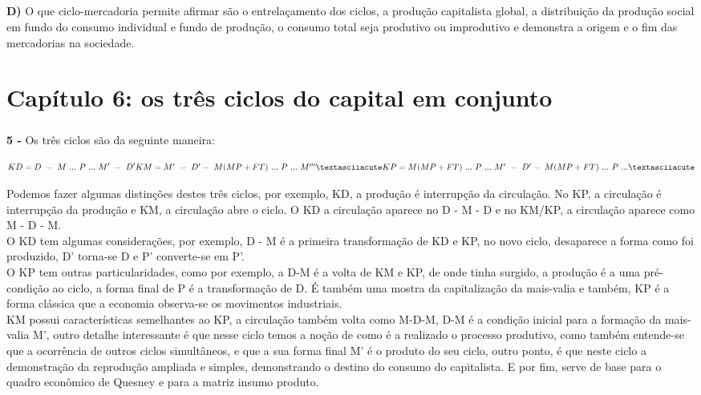 \documentclass[a4paper, 12pt]{article} %
\begin{document}
\subparagraph{} \textbf{D)} O que ciclo-mercadoria permite afirmar são o entrelaçamento dos ciclos, a produção capitalista global, a distribuição da produção social em fundo do consumo individual e fundo de produção, o consumo total seja produtivo ou improdutivo e demonstra a origem e o fim das mercadorias na sociedade.


\vspace{0.5cm}

\par \section{Capítulo 6: os três ciclos do capital em conjunto}
\vspace{0.5cm}


\subparagraph{} \textbf{5 -} Os três ciclos são da seguinte maneira: 

\begin{equation}
KD = D \ - \ M \ ... \ P \ ... \ M' \ - \ D'
$$\\$$
KM = M' \ - \ D' - \ M(MP + FT) \ ... \ P \ ... \ M'''´
$$\\$$
KP = M(MP + FT) \ ...\ P\ ... \ M' \ - \ D' - \ M(MP + FT) \ ... \ P \ ...´
\end{equation}

Podemos fazer algumas distinções destes três ciclos, por exemplo, KD, a produção é interrupção da circulação. No KP, a circulação é interrupção da produção e KM, a circulação abre o ciclo. O KD a circulação aparece no D - M - D e no KM/KP, a circulação aparece como M - D - M. 
\\
O KD tem algumas considerações, por exemplo, D - M é a primeira transformação de KD e KP, no novo ciclo, desaparece a forma como foi produzido, D' torna-se D e P' converte-se em P'.
\\
O KP tem outras particularidades, como por exemplo, a D-M é a volta de KM e KP, de onde tinha surgido, a produção é a uma pré-condição ao ciclo, a forma final de P é a transformação de D. É também uma mostra da capitalização da mais-valia e também, KP é a forma clássica que a economia observa-se os movimentos industriais.
\\
KM possui características semelhantes ao KP, a circulação também volta como M-D-M, D-M é a condição inicial para a formação da mais-valia M', outro detalhe interessante é que nesse ciclo temos a noção de como é a realizado o processo produtivo, como também entende-se que a ocorrência de outros ciclos simultâneos, e que a sua forma final M' é o produto do seu ciclo, outro ponto, é que neste ciclo a demonstração da reprodução ampliada e simples, demonstrando o destino do consumo do capitalista. E por fim, serve de base para o quadro econômico de Quesney e para a matriz insumo produto.
\end{document}
